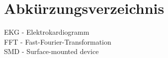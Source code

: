 
\section{Abkürzungsverzeichnis}

EKG - Elektrokardiogramm \\ FFT - Fast-Fourier-Transformation \\ SMD - Surface-mounted device \\
